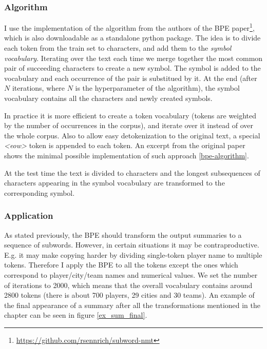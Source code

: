 \subsubsection{Algorithm}

I use the implementation of the algorithm from the authors of the BPE paper\footnote{\url{https://github.com/rsennrich/subword-nmt}}, which is also downloadable as a standalone python package. The idea is to divide each token from the train set to characters, and add them to the \emph{symbol vocabulary}. Iterating over the text each time we merge together the most common pair of succeeding characters to create a new symbol. The symbol is added to the vocabulary and each occurrence of the pair is substitued by it. At the end (after $N$ iterations, where $N$ is the hyperparameter of the algorithm), the symbol vocabulary contains all the characters and newly created symbols.

In practice it is more efficient to create a token vocabulary (tokens are weigh\-ted by the number of occurrences in the corpus), and iterate over it instead of over the whole corpus. Also to allow easy detokenization to the original text, a special \emph{\textless eow\textgreater} token is appended to each token. An excerpt from the original paper shows the minimal possible implementation of such approach \ref{bpe-algorithm}.

At the test time the text is divided to characters and the longest subsequences of characters appearing in the symbol vocabulary are transformed to the corresponding symbol.

\subsubsection{Application}

As stated previously, the BPE should transform the output summaries to a sequence of subwords. However, in certain situations it may be contraproductive. E.g. it may make copying harder by dividing single-token player name to multiple tokens. Therefore I apply the BPE to all the tokens except the ones which correspond to player/city/team names and numerical values. We set the number of iterations to 2000, which means that the overall vocabulary contains around 2800 tokens (there is about 700 players, 29 cities and 30 teams). An example of the final appearance of a summary after all the transformations mentioned in the chapter can be seen in figure \ref{ex_sum_final}. 

